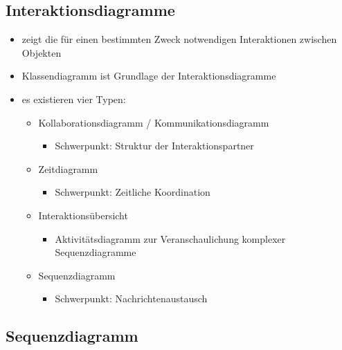\newpage

\subsection{Interaktionsdiagramme}

\begin{itemize}
    \item zeigt die für einen bestimmten Zweck notwendigen Interaktionen zwischen Objekten
    \item Klassendiagramm ist Grundlage der Interaktionsdiagramme
    \item es existieren vier Typen:
    \begin{itemize}
        \item Kollaborationsdiagramm / Kommunikationsdiagramm
        \begin{itemize}
            \item Schwerpunkt: Struktur der Interaktionspartner
        \end{itemize}
        \item Zeitdiagramm
        \begin{itemize}
            \item Schwerpunkt: Zeitliche Koordination
        \end{itemize}
        \item Interaktionsübersicht
        \begin{itemize}
            \item Aktivitätsdiagramm zur Veranschaulichung komplexer Sequenzdiagramme
        \end{itemize}
        \item Sequenzdiagramm
        \begin{itemize}
            \item Schwerpunkt: Nachrichtenaustausch
        \end{itemize}
    \end{itemize}
\end{itemize}

\subsection{Sequenzdiagramm}

